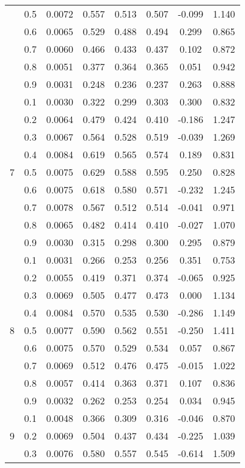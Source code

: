 \documentclass[11pt,a4paper]{report}
\begin{document}
\begin{longtable}{ | c | c || c | c | c | c | c | c | }
 & 0.5 & 0.0072 & 0.557 & 0.513 & 0.507 & -0.099 & 1.140 \\
 & 0.6 & 0.0065 & 0.529 & 0.488 & 0.494 & 0.299 & 0.865 \\
 & 0.7 & 0.0060 & 0.466 & 0.433 & 0.437 & 0.102 & 0.872 \\
 & 0.8 & 0.0051 & 0.377 & 0.364 & 0.365 & 0.051 & 0.942 \\
 & 0.9 & 0.0031 & 0.248 & 0.236 & 0.237 & 0.263 & 0.888 \\
 \hline
\multirow{9}{*}{7} & 0.1 & 0.0030 & 0.322 & 0.299 & 0.303 & 0.300 & 0.832 \\
 & 0.2 & 0.0064 & 0.479 & 0.424 & 0.410 & -0.186 & 1.247 \\
 & 0.3 & 0.0067 & 0.564 & 0.528 & 0.519 & -0.039 & 1.269 \\
 & 0.4 & 0.0084 & 0.619 & 0.565 & 0.574 & 0.189 & 0.831 \\
 & 0.5 & 0.0075 & 0.629 & 0.588 & 0.595 & 0.250 & 0.828 \\
 & 0.6 & 0.0075 & 0.618 & 0.580 & 0.571 & -0.232 & 1.245 \\
 & 0.7 & 0.0078 & 0.567 & 0.512 & 0.514 & -0.041 & 0.971 \\
 & 0.8 & 0.0065 & 0.482 & 0.414 & 0.410 & -0.027 & 1.070 \\
 & 0.9 & 0.0030 & 0.315 & 0.298 & 0.300 & 0.295 & 0.879 \\
 \hline
\multirow{9}{*}{8} & 0.1 & 0.0031 & 0.266 & 0.253 & 0.256 & 0.351 & 0.753 \\
 & 0.2 & 0.0055 & 0.419 & 0.371 & 0.374 & -0.065 & 0.925 \\
 & 0.3 & 0.0069 & 0.505 & 0.477 & 0.473 & 0.000 & 1.134 \\
 & 0.4 & 0.0084 & 0.570 & 0.535 & 0.530 & -0.286 & 1.149 \\
 & 0.5 & 0.0077 & 0.590 & 0.562 & 0.551 & -0.250 & 1.411 \\
 & 0.6 & 0.0075 & 0.570 & 0.529 & 0.534 & 0.057 & 0.867 \\
 & 0.7 & 0.0069 & 0.512 & 0.476 & 0.475 & -0.015 & 1.022 \\
 & 0.8 & 0.0057 & 0.414 & 0.363 & 0.371 & 0.107 & 0.836 \\
 & 0.9 & 0.0032 & 0.262 & 0.253 & 0.254 & 0.034 & 0.945 \\
 \hline
\multirow{9}{*}{9} & 0.1 & 0.0048 & 0.366 & 0.309 & 0.316 & -0.046 & 0.870 \\
 & 0.2 & 0.0069 & 0.504 & 0.437 & 0.434 & -0.225 & 1.039 \\
 & 0.3 & 0.0076 & 0.580 & 0.557 & 0.545 & -0.614 & 1.509 \\

\end{longtable}
\end{document}
